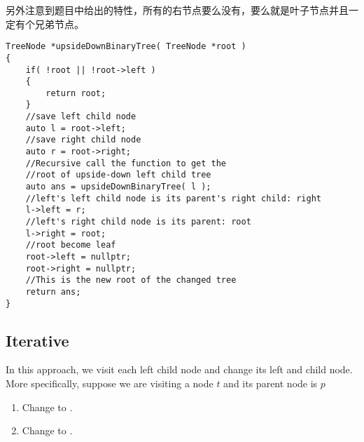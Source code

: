 另外注意到题目中给出的特性，所有的右节点要么没有，要么就是叶子节点并且一定有个兄弟节点。

\setcounter{lstlisting}{0}
\begin{lstlisting}[style=customc, caption={Recursive Approach}]
TreeNode *upsideDownBinaryTree( TreeNode *root )
{
    if( !root || !root->left )
    {
        return root;
    }
    //save left child node
    auto l = root->left;
    //save right child node
    auto r = root->right;
    //Recursive call the function to get the
    //root of upside-down left child tree
    auto ans = upsideDownBinaryTree( l );
    //left's left child node is its parent's right child: right
    l->left = r;
    //left's right child node is its parent: root
    l->right = root;
    //root become leaf
    root->left = nullptr;
    root->right = nullptr;
    //This is the new root of the changed tree
    return ans;
}
\end{lstlisting}

\subsection{Iterative}
In this approach, we visit each left child node and change its left and child node. More specifically, suppose we are visiting a node $t$ and its parent node is $p$

\begin{enumerate}
\item Change  to .
\item Change  to .
\end{enumerate}


